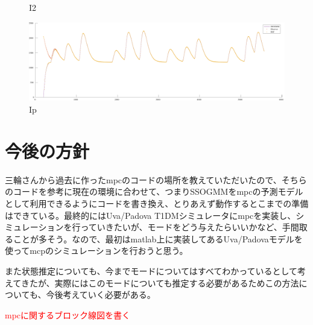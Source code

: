 \documentclass[platex]{jsarticle}
\begin{document}
\begin{figure}[H]
\begin{minipage}{0.65\columnwidth}
     \caption{I2}
     \label{fig:002i2}
  \end{minipage}
%
  \begin{minipage}{0.65\columnwidth}
     \centering
     \includegraphics[width=\columnwidth]{fig/002ip.pdf}
     \caption{Ip}
     \label{fig:002ip}
  \end{minipage}
\end{figure}



\section{今後の方針}
三輪さんから過去に作ったmpcのコードの場所を教えていただいたので、そちらのコードを参考に現在の環境に合わせて、つまりSSOGMMをmpcの予測モデルとして利用できるようにコードを書き換え、とりあえず動作するとこまでの準備はできている。最終的にはUva/Padova T1DMシミュレータにmpcを実装し、シミュレーションを行っていきたいが、モードをどう与えたらいいかなど、手間取ることが多そう。なので、最初はmatlab上に実装してあるUva/Padovaモデルを使ってmcpのシミュレーションを行おうと思う。

また状態推定についても、今までモードについてはすべてわかっているとして考えてきたが、実際にはこのモードについても推定する必要があるためこの方法についても、今後考えていく必要がある。

\textcolor{red}{mpcに関するブロック線図を書く}
\end{document}
